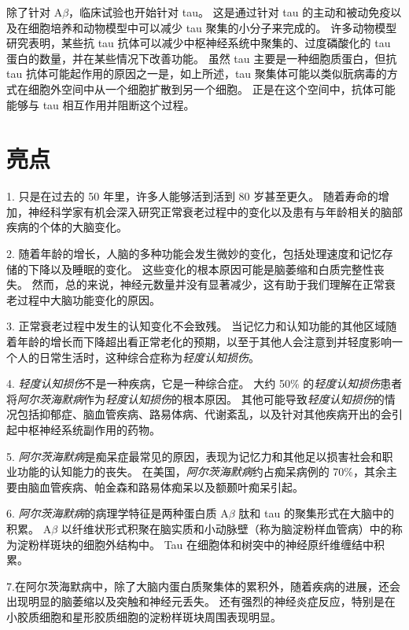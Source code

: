 除了针对 A$\beta$，临床试验也开始针对 tau。
这是通过针对 tau 的主动和被动免疫以及在细胞培养和动物模型中可以减少 tau 聚集的小分子来完成的。
许多动物模型研究表明，某些抗 tau 抗体可以减少中枢神经系统中聚集的、过度磷酸化的 tau 蛋白的数量，并在某些情况下改善功能。
虽然 tau 主要是一种细胞质蛋白，但抗 tau 抗体可能起作用的原因之一是，如上所述，tau 聚集体可能以类似朊病毒的方式在细胞外空间中从一个细胞扩散到另一个细胞。
正是在这个空间中，抗体可能能够与 tau 相互作用并阻断这个过程。



\section{亮点}

1. 只是在过去的 50 年里，许多人能够活到活到 80 岁甚至更久。
随着寿命的增加，神经科学家有机会深入研究正常衰老过程中的变化以及患有与年龄相关的脑部疾病的个体的大脑变化。


2. 随着年龄的增长，人脑的多种功能会发生微妙的变化，包括处理速度和记忆存储的下降以及睡眠的变化。
这些变化的根本原因可能是脑萎缩和白质完整性丧失。
然而，总的来说，神经元数量并没有显著减少，这有助于我们理解在正常衰老过程中大脑功能变化的原因。


3. 正常衰老过程中发生的认知变化不会致残。
当记忆力和认知功能的其他区域随着年龄的增长而下降超出看正常老化的预期，以至于其他人会注意到并轻度影响一个人的日常生活时，这种综合症称为\textit{轻度认知损伤}。


4. \textit{轻度认知损伤}不是一种疾病，它是一种综合症。
大约 50\% 的\textit{轻度认知损伤}患者将\textit{阿尔茨海默病}作为\textit{轻度认知损伤}的根本原因。
其他可能导致\textit{轻度认知损伤}的情况包括抑郁症、脑血管疾病、路易体病、代谢紊乱，以及针对其他疾病开出的会引起中枢神经系统副作用的药物。


5. \textit{阿尔茨海默病}是痴呆症最常见的原因，表现为记忆力和其他足以损害社会和职业功能的认知能力的丧失。
在美国，\textit{阿尔茨海默病}约占痴呆病例的 70\%，其余主要由脑血管疾病、帕金森和路易体痴呆以及额颞叶痴呆引起。


6. \textit{阿尔茨海默病}的病理学特征是两种蛋白质 A$\beta$ 肽和 tau 的聚集形式在大脑中的积累。
A$\beta$ 以纤维状形式积聚在脑实质和小动脉壁（称为脑淀粉样血管病）中的称为淀粉样斑块的细胞外结构中。
Tau 在细胞体和树突中的神经原纤维缠结中积累。


7.在阿尔茨海默病中，除了大脑内蛋白质聚集体的累积外，随着疾病的进展，还会出现明显的脑萎缩以及突触和神经元丢失。
还有强烈的神经炎症反应，特别是在小胶质细胞和星形胶质细胞的淀粉样斑块周围表现明显。


